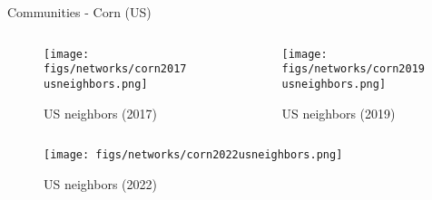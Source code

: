 \documentclass[10pt,xcolor={dvipsnames}]{beamer}
\begin{document}
\begin{frame}{Communities - Corn (US)}

\begin{columns}[onlytextwidth]
    \begin{column}{.5\textwidth}
        \begin{minipage}[t][.5\textheight][t]{\textwidth}
            \begin{figure}
                \caption*{\tiny US neighbors (2017)}
                \texttt{[image: figs/networks/corn2017usneighbors.png]}
            \end{figure}
        \end{minipage}
    \end{column}
\hfill
    \begin{column}{.5\textwidth}
        \begin{minipage}[t][.5\textheight][t]{\textwidth}
            \begin{figure}
                \caption*{\tiny US neighbors (2019)}
                \texttt{[image: figs/networks/corn2019usneighbors.png]}\\
            \end{figure}
        \end{minipage}
    \end{column}
\end{columns}
\vspace{-35pt}
\begin{figure}
    \centering
    \caption*{\tiny US neighbors (2022)}
    \texttt{[image: figs/networks/corn2022usneighbors.png]}    
\end{figure}

\end{frame}
\end{document}
